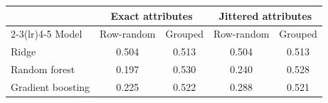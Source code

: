 \begin{tabular}{lcccc}
\toprule
 & \multicolumn{2}{c}{Exact attributes} & \multicolumn{2}{c}{Jittered attributes} \\
\cmidrule(lr){2-3}\cmidrule(lr){4-5}
Model & Row-random & Grouped & Row-random & Grouped \\
\midrule
Ridge & 0.504 & 0.513 & 0.504 & 0.513 \\
Random forest & 0.197 & 0.530 & 0.240 & 0.528 \\
Gradient boosting & 0.225 & 0.522 & 0.288 & 0.521 \\
\bottomrule
\end{tabular}
